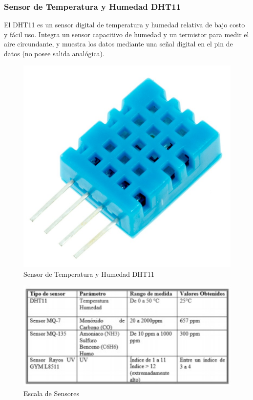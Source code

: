 \documentclass[10pt,a4paper]{article}
\begin{document}
\begin{multicols}{2}
\begin{itemize}
\subsubsection{Sensor de Temperatura y Humedad DHT11}
El DHT11 es un sensor digital de temperatura y humedad relativa de bajo costo y fácil uso. Integra un sensor capacitivo de humedad y un termistor para medir el aire circundante, y muestra los datos mediante una señal digital en el pin de datos (no posee salida analógica). 
\begin{figure}[H]
\centering
\includegraphics[scale=0.33]{dh.PNG}
\caption{Sensor de Temperatura y Humedad DHT11}
\end{figure}

\begin{figure}[H]
\centering
\includegraphics[scale=0.75]{tablita.PNG}
\caption{Escala de Sensores}
\end{figure}



\end{itemize}
\end{multicols}
\end{document}
